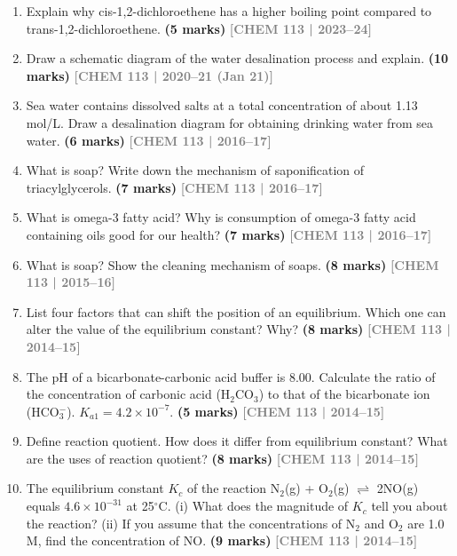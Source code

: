 \documentclass[12pt,a3paper]{article}
\newcommand{\yr}[1]{\hfill\textcolor{gray}{\small\textbf{[#1]}}}
\newcommand{\mk}[1]{\textcolor{orange!70!black}{\small\textbf{(#1 marks)}}}
\begin{document}
\begin{enumerate}
\item Explain why cis-1,2-dichloroethene has a higher boiling point compared to trans-1,2-dichloroethene. \mk{5}
\yr{CHEM 113 | 2023--24}




\item Draw a schematic diagram of the water desalination process and explain. \mk{10}
\yr{CHEM 113 | 2020--21 (Jan 21)}



\item Sea water contains dissolved salts at a total concentration of about 1.13 mol/L. Draw a desalination diagram for obtaining drinking water from sea water. \mk{6}
\yr{CHEM 113 | 2016--17}

% 

\item What is soap? Write down the mechanism of saponification of triacylglycerols. \mk{7}
\yr{CHEM 113 | 2016--17}



\item What is omega-3 fatty acid? Why is consumption of omega-3 fatty acid containing oils good for our health? \mk{7}
\yr{CHEM 113 | 2016--17}



\item What is soap? Show the cleaning mechanism of soaps. \mk{8}
\yr{CHEM 113 | 2015--16}



\item List four factors that can shift the position of an equilibrium. Which one can alter the value of the equilibrium constant? Why? \mk{8}
\yr{CHEM 113 | 2014--15}

\item The pH of a bicarbonate-carbonic acid buffer is 8.00. Calculate the ratio of the concentration of carbonic acid (H$_2$CO$_3$) to that of the bicarbonate ion (HCO$_3^-$). $K_{a1} = 4.2 \times 10^{-7}$. \mk{5}
\yr{CHEM 113 | 2014--15}

\item Define reaction quotient. How does it differ from equilibrium constant? What are the uses of reaction quotient? \mk{8}
\yr{CHEM 113 | 2014--15}

\item The equilibrium constant $K_c$ of the reaction N$_2$(g) + O$_2$(g) $\rightleftharpoons$ 2NO(g) equals $4.6 \times 10^{-31}$ at 25$^\circ$C. (i) What does the magnitude of $K_c$ tell you about the reaction? (ii) If you assume that the concentrations of N$_2$ and O$_2$ are 1.0 M, find the concentration of NO. \mk{9}
\yr{CHEM 113 | 2014--15}


\end{enumerate}
\end{document}
